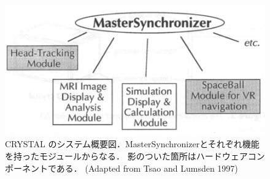 \begin{figure}[htbp]
  \centering
  \includegraphics[keepaspectratio, width=0.7\linewidth]{figures/crystal.png}
  \caption{
    CRYSTAL のシステム概要図．MasterSynchronizerとそれぞれ機能を持ったモジュールからなる．
    影のついた箇所はハードウェアコンポーネントである．
    (Adapted from Tsao and Lumsden 1997\cite{crystal})
  }
  \label{fig:crystal}
\end{figure}


